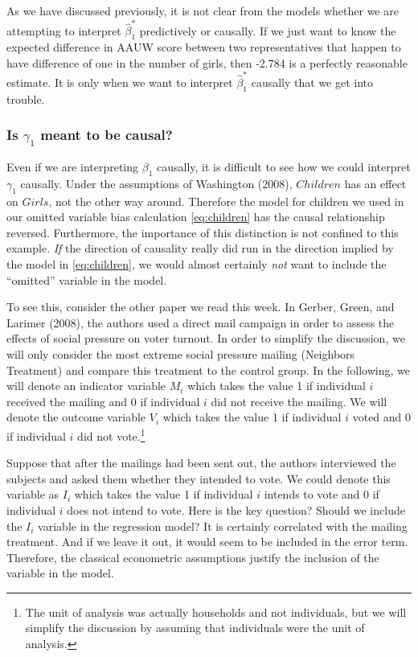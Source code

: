 \documentclass{article}
\begin{document}
As we have discussed previously, it is not clear from the models whether we are attempting to interpret $\widehat{\beta}_1^{*}$ predictively or causally. If we just want to know the expected difference in AAUW score between two representatives that happen to have difference of one in the number of girls, then -2.784 is a perfectly reasonable estimate. It is only when we want to interpret $\widehat{\beta}_1^{*}$ causally that we get into trouble.

\subsubsection{Is $\gamma_1$ meant to be causal?}

Even if we are interpreting $\beta_1$ causally, it is difficult to see how we could interpret $\gamma_1$ causally. Under the assumptions of Washington (2008), $Children$ has an effect on $Girls$, not the other way around. Therefore the model for children we used in our omitted variable bias calculation \eqref{eq:children} has the causal relationship reversed. Furthermore, the importance of this distinction is not confined to this example. \emph{If} the direction of causality really did run in the direction implied by the model in \eqref{eq:children}, we would almost certainly \emph{not} want to include the ``omitted'' variable in the model. 

To see this, consider the other paper we read this week. In Gerber, Green, and Larimer (2008), the authors used a direct mail campaign in order to assess the effects of social pressure on voter turnout. In order to simplify the discussion, we will only consider the most extreme social pressure mailing (Neighbors Treatment) and compare this treatment to the control group. In the following, we will denote an indicator variable $M_i$ which takes the value 1 if individual $i$ received the mailing and 0 if individual $i$ did not receive the mailing. We will denote the outcome variable $V_i$ which takes the value 1 if individual $i$ voted and 0 if individual $i$ did not vote.\footnote{The unit of analysis was actually households and not individuals, but we will simplify the discussion by assuming that individuals were the unit of analysis.}

Suppose that after the mailings had been sent out, the authors interviewed the subjects and asked them whether they intended to vote. We could denote this variable as $I_i$ which takes the value 1 if individual $i$ intends to vote and 0 if individual $i$ does not intend to vote. Here is the key question? Should we include the $I_i$ variable in the regression model? It is certainly correlated with the mailing treatment. And if we leave it out, it would seem to be included in the error term. Therefore, the classical econometric assumptions justify the inclusion of the variable in the model. 
\end{document}
